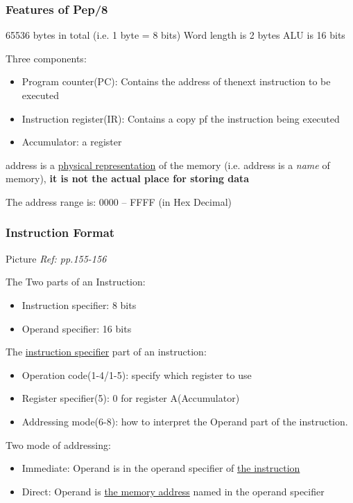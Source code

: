 \documentclass[12pt]{article}
\begin{document}
\subsubsection{Features of Pep/8}
65536 bytes in total (i.e. 1 byte = 8 bits)\newline
Word length is 2 bytes\newline
ALU is 16 bits\newline

Three components:
\begin{itemize}
    \item Program counter(PC): Contains the address of thenext instruction to be executed
    \item Instruction register(IR): Contains a copy pf the instruction being executed
    \item Accumulator: a register
\end{itemize}

address is a \underline{physical representation} of the memory (i.e. address is a \emph{name} of memory),
\textbf{it is not the actual place for storing data}

The address range is: 0000 -- FFFF (in Hex Decimal)

\subsubsection{Instruction Format}
Picture \emph{Ref: pp.155-156}

The Two parts of an Instruction:
\begin{itemize}
    \item Instruction specifier: 8 bits
    \item Operand specifier: 16 bits
\end{itemize}

The \underline{instruction specifier} part of an instruction:
\begin{itemize}
    \item Operation code(1-4/1-5): specify which register to use
    \item Register specifier(5): 0 for register A(Accumulator)
    \item Addressing mode(6-8): how to interpret the Operand part of the instruction.
\end{itemize}

Two mode of addressing:
\begin{itemize}
    \item Immediate: Operand is in the operand specifier of \underline{the instruction}
    \item Direct: Operand is \underline{the memory address} named in the operand specifier
\end{itemize}
\end{document}
